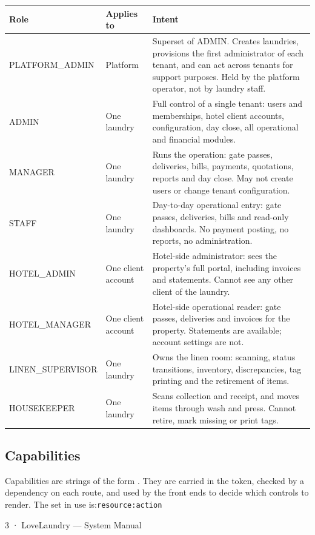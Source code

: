 \documentclass[11pt,a4paper,oneside]{book}
\begin{document}
\begin{center}\small
\begin{tabularx}{\linewidth}{|X|X|X|}
\hline
\rowcolor{lightgrey}
\textbf{Role} & \textbf{Applies to} & \textbf{Intent} \\ \hline
PLATFORM\_ADMIN & Platform & Superset of ADMIN. Creates laundries, provisions the first administrator of each tenant, and can act across tenants for support purposes. Held by the platform operator, not by laundry staff. \\ \hline
ADMIN & One laundry & Full control of a single tenant: users and memberships, hotel client accounts, configuration, day close, all operational and financial modules. \\ \hline
MANAGER & One laundry & Runs the operation: gate passes, deliveries, bills, payments, quotations, reports and day close. May not create users or change tenant configuration. \\ \hline
STAFF & One laundry & Day-to-day operational entry: gate passes, deliveries, bills and read-only dashboards. No payment posting, no reports, no administration. \\ \hline
HOTEL\_ADMIN & One client account & Hotel-side administrator: sees the property's full portal, including invoices and statements. Cannot see any other client of the laundry. \\ \hline
HOTEL\_MANAGER & One client account & Hotel-side operational reader: gate passes, deliveries and invoices for the property. Statements are available; account settings are not. \\ \hline
LINEN\_SUPERVISOR & One laundry & Owns the linen room: scanning, status transitions, inventory, discrepancies, tag printing and the retirement of items. \\ \hline
HOUSEKEEPER & One laundry & Scans collection and receipt, and moves items through wash and press. Cannot retire, mark missing or print tags. \\ \hline
\end{tabularx}
\end{center}
\subsection*{Capabilities}
Capabilities are strings of the form . They are carried in the token, checked by a dependency on each route, and used by the front ends to decide which controls to render. The set in use is:\texttt{resource:action}

3 · LoveLaundry — System Manual
\end{document}
